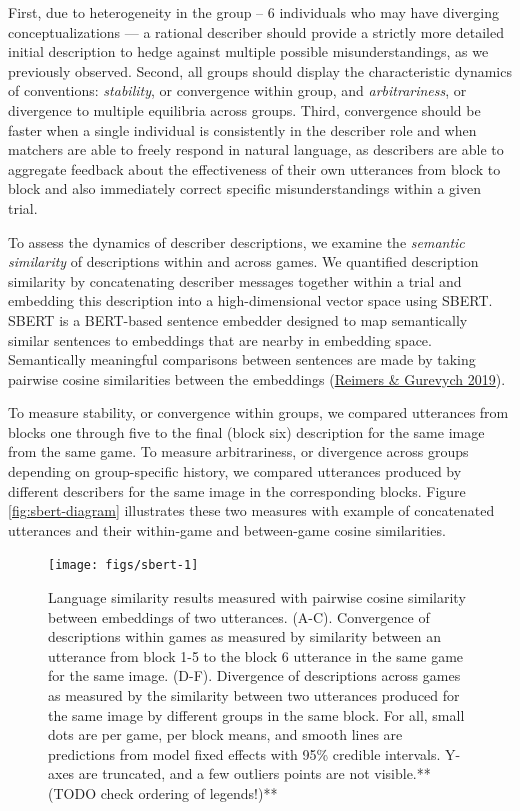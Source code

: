 \documentclass[
  english,
]{article}
\begin{document}
First, due to heterogeneity in the group -- 6 individuals who may have diverging conceptualizations --- a rational describer should provide a strictly more detailed initial description to hedge against multiple possible misunderstandings, as we previously observed.
Second, all groups should display the characteristic dynamics of conventions: \emph{stability}, or convergence within group, and \emph{arbitrariness}, or divergence to multiple equilibria across groups.
Third, convergence should be faster when a single individual is consistently in the describer role and when matchers are able to freely respond in natural language, as describers are able to aggregate feedback about the effectiveness of their own utterances from block to block and also immediately correct specific misunderstandings within a given trial.

To assess the dynamics of describer descriptions, we examine the \emph{semantic similarity} of descriptions within and across games.
We quantified description similarity by concatenating describer messages together within a trial and embedding this description into a high-dimensional vector space using SBERT.
SBERT is a BERT-based sentence embedder designed to map semantically similar sentences to embeddings that are nearby in embedding space.
Semantically meaningful comparisons between sentences are made by taking pairwise cosine similarities between the embeddings (\protect\hyperlink{ref-reimers2019}{Reimers \& Gurevych 2019}).

To measure stability, or convergence within groups, we compared utterances from blocks one through five to the final (block six) description for the same image from the same game.
To measure arbitrariness, or divergence across groups depending on group-specific history, we compared utterances produced by different describers for the same image in the corresponding blocks.
Figure \ref{fig:sbert-diagram} illustrates these two measures with example of concatenated utterances and their within-game and between-game cosine similarities.

\begin{figure}[t!]

{\centering \texttt{[image: figs/sbert-1]} 

}

\caption{Language similarity results measured with pairwise cosine similarity between embeddings of two utterances. (A-C). Convergence of descriptions within games as measured by similarity between an utterance from block 1-5 to the block 6 utterance in the same game for the same image. (D-F). Divergence of descriptions across games as measured by the similarity between two utterances produced for the same image by different groups in the same block. For all, small dots are per game, per block means, and smooth lines are predictions from model fixed effects with 95\% credible intervals. Y-axes are truncated, and a few outliers points are not visible.**(TODO check ordering of legends!)**}\label{fig:sbert}
\end{figure}
\end{document}
